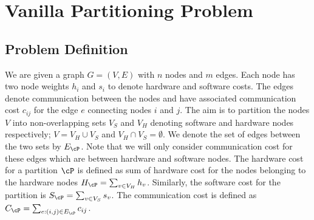 \appendix
\section{Vanilla Partitioning Problem}

\subsection{Problem Definition}

We are given a graph $G=\left(V,E\right)$ with $n$ nodes and $m$ edges. Each node has two node weights $h_i$ and $s_i$ to denote hardware and software costs.
The edges denote communication between the nodes and have associated communication cost $c_{ij}$ for the edge $e$ connecting nodes $i$ and $j$.
The aim is to partition the nodes $V$ into non-overlapping sets $V_S$ and $V_H$ denoting software and hardware nodes respectively; $V=V_H \cup V_S$ and $V_H \cap V_S = \emptyset$.
We denote the set of edges between the two sets by $E_{\cP}$. 
Note that we will only consider communication cost for these edges which are between hardware and software nodes.
The hardware cost for a partition $\cP$ is defined as sum of hardware cost for the nodes belonging to the hardware nodes 
$H_{\cP} = \sum_{v\in V_H}h_v$. Similarly, the software cost for the partition is $S_{\cP} = \sum_{v\in V_S}s_v$.
The communication cost is defined as $C_{\cP} = \sum_{e:(i,j) \in E_\cP} c_{ij}$.

